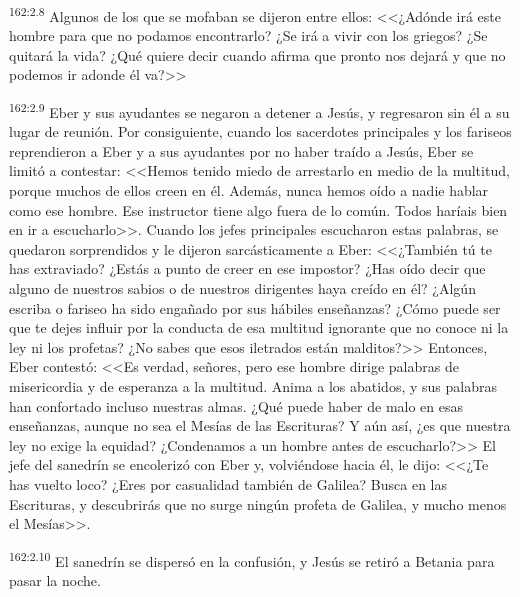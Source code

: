 \par 
\textsuperscript{162:2.8} Algunos de los que se mofaban se dijeron entre ellos: <<¿Adónde irá este hombre para que no podamos encontrarlo? ¿Se irá a vivir con los griegos? ¿Se quitará la vida? ¿Qué quiere decir cuando afirma que pronto nos dejará y que no podemos ir adonde él va?>>

\par 
\textsuperscript{162:2.9} Eber y sus ayudantes se negaron a detener a Jesús, y regresaron sin él a su lugar de reunión. Por consiguiente, cuando los sacerdotes principales y los fariseos reprendieron a Eber y a sus ayudantes por no haber traído a Jesús, Eber se limitó a contestar: <<Hemos tenido miedo de arrestarlo en medio de la multitud, porque muchos de ellos creen en él. Además, nunca hemos oído a nadie hablar como ese hombre. Ese instructor tiene algo fuera de lo común. Todos haríais bien en ir a escucharlo>>. Cuando los jefes principales escucharon estas palabras, se quedaron sorprendidos y le dijeron sarcásticamente a Eber: <<¿También tú te has extraviado? ¿Estás a punto de creer en ese impostor? ¿Has oído decir que alguno de nuestros sabios o de nuestros dirigentes haya creído en él? ¿Algún escriba o fariseo ha sido engañado por sus hábiles enseñanzas? ¿Cómo puede ser que te dejes influir por la conducta de esa multitud ignorante que no conoce ni la ley ni los profetas? ¿No sabes que esos iletrados están malditos?>> Entonces, Eber contestó: <<Es verdad, señores, pero ese hombre dirige palabras de misericordia y de esperanza a la multitud. Anima a los abatidos, y sus palabras han confortado incluso nuestras almas. ¿Qué puede haber de malo en esas enseñanzas, aunque no sea el Mesías de las Escrituras? Y aún así, ¿es que nuestra ley no exige la equidad? ¿Condenamos a un hombre antes de escucharlo?>> El jefe del sanedrín se encolerizó con Eber y, volviéndose hacia él, le dijo: <<¿Te has vuelto loco? ¿Eres por casualidad también de Galilea? Busca en las Escrituras, y descubrirás que no surge ningún profeta de Galilea, y mucho menos el Mesías>>.

\par 
\textsuperscript{162:2.10} El sanedrín se dispersó en la confusión, y Jesús se retiró a Betania para pasar la noche.

